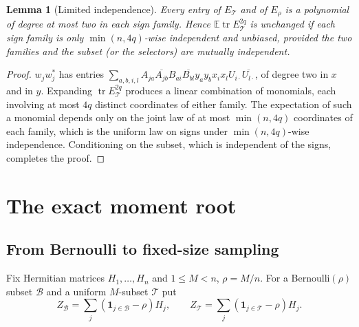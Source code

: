\documentclass[11pt,a4paper]{article}
\newtheorem{lemma}[theorem]{Lemma}
\theoremstyle{definition}
\theoremstyle{remark}
\numberwithin{equation}{section}
\newcommand{\E}{\mathbb E}
\newcommand{\tr}{\operatorname{tr}}
\newcommand{\cT}{\mathcal T}
\begin{document}
\begin{lemma}[Limited independence]\label{lem:limited}
Every entry of $E_\cT$ and of $E_\rho$ is a polynomial of degree at most two in
each sign family. Hence $\E\tr E_\cT^{2q}$ is unchanged if each sign family is
only $\min(n,4q)$-wise independent and unbiased, provided the two families and
the subset (or the selectors) are mutually independent.
\end{lemma}
\begin{proof}
$w_jw_j^*$ has entries $\sum_{a,b,i,l}A_{ja}\overline{A_{jb}}B_{ai}\overline{B_{bl}}
y_ay_bx_ix_lU_{i\cdot}\overline{U_{l\cdot}}$, of degree two in $x$ and in $y$.
Expanding $\tr E_\cT^{2q}$ produces a linear combination of monomials, each
involving at most $4q$ distinct coordinates of either family. The
expectation of such a monomial depends only on the joint law of at most
$\min(n,4q)$ coordinates of each family, which is the uniform law on signs
under $\min(n,4q)$-wise independence. Conditioning on the subset, which is
independent of the signs, completes the proof.
\end{proof}

\section{The exact moment root}\label{sec:exactroot}

\subsection{From Bernoulli to fixed-size sampling}
Fix Hermitian matrices $H_1,\dots,H_n$ and $1\le M<n$, $\rho=M/n$. For a
Bernoulli$(\rho)$ subset $\mathcal B$ and a uniform $M$-subset $\cT$ put
\[
 Z_{\mathcal B}=\sum_j(\mathbf 1_{j\in\mathcal B}-\rho)H_j,\qquad
 Z_\cT=\sum_j(\mathbf 1_{j\in\cT}-\rho)H_j .
\]
\end{document}
